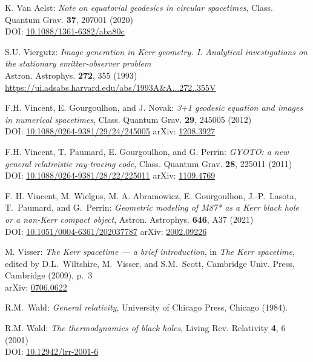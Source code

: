 \begin{thebibliography}{123}
K. Van Aelst: {\em Note on equatorial geodesics in circular spacetimes},
Class. Quantum Grav. {\bf 37}, 207001 (2020)\\
DOI: \href{https://doi.org/10.1088/1361-6382/aba80c}{10.1088/1361-6382/aba80c}

S.U. Viergutz:
{\em Image generation in Kerr geometry. I. Analytical investigations on the stationary emitter-observer problem}\\
Astron. Astrophys. {\bf 272}, 355 (1993)\\
\url{https://ui.adsabs.harvard.edu/abs/1993A&A...272..355V}

F.H. Vincent, E. Gourgoulhon, and J. Novak:
{\em 3+1 geodesic equation and images in numerical spacetimes},
Class. Quantum Grav. {\bf 29}, 245005 (2012)\\
DOI: \href{https://doi.org/10.1088/0264-9381/29/24/245005}{10.1088/0264-9381/29/24/245005}\hfill
arXiv: \href{https://arxiv.org/abs/1208.3927}{1208.3927}

F.H. Vincent, T. Paumard, E. Gourgoulhon, and G. Perrin:
{\em GYOTO: a new general relativistic ray-tracing code},
Class. Quantum Grav. {\bf 28}, 225011 (2011)\\
DOI: \href{https://doi.org/10.1088/0264-9381/28/22/225011}{10.1088/0264-9381/28/22/225011}
\hfill
arXiv: \href{https://arxiv.org/abs/1109.4769}{1109.4769}

F. H. Vincent, M. Wielgus, M. A. Abramowicz, E. Gourgoulhon, J.-P.~Lasota, T.~Paumard,
and G.~Perrin:
{\em Geometric modeling of M87* as a Kerr black hole or a non-Kerr compact object},
Astron. Astrophys. {\bf 646}, A37 (2021)\\
DOI: \href{https://doi.org/10.1051/0004-6361/202037787}{10.1051/0004-6361/202037787}\hfill
arXiv: \href{https://arxiv.org/abs/2002.09226}{2002.09226}

M. Visser: {\em The Kerr spacetime --- a brief introduction},
in {\em The Kerr spacetime}, edited by D.L.~Wiltshire, M.~Visser, and S.M.~Scott,
Cambridge Univ. Press, Cambridge (2009), p.~3\\
arXiv: \href{https://arxiv.org/abs/0706.0622}{0706.0622}

R.M.~Wald: {\em General relativity},
University of Chicago Press, Chicago (1984).

R.M. Wald: {\em The thermodynamics of black holes},
Living Rev. Relativity {\bf 4}, 6 (2001) \\
DOI: \href{https://doi.org/10.12942/lrr-2001-6}{10.12942/lrr-2001-6}


\end{thebibliography}
